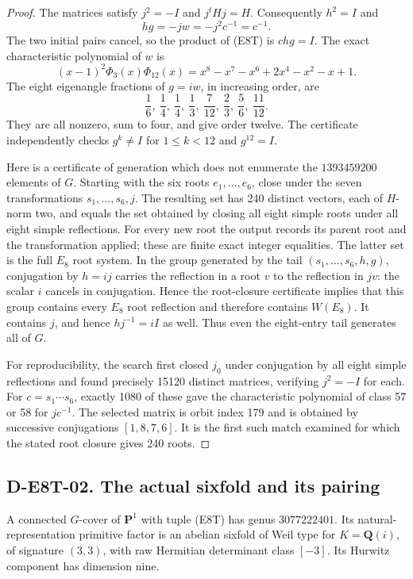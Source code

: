 \begin{proof}
The matrices satisfy $j^2=-I$ and $j^tHj=H$. Consequently
$h^2=I$ and
\[
hg=-jw=-j^2c^{-1}=c^{-1}.
\]
The two initial pairs cancel, so the product of (E8T) is $chg=I$.
The exact characteristic polynomial of $w$ is
\[
(x-1)^2\Phi_3(x)\Phi_{12}(x)
=x^8-x^7-x^6+2x^4-x^2-x+1.
\]
The eight eigenangle fractions of $g=iw$, in increasing order, are
\[
\frac16,\ \frac14,\ \frac14,\ \frac13,\ \frac7{12},\
\frac23,\ \frac56,\ \frac{11}{12}.
\tag{E8T-spectrum}
\]
They are all nonzero, sum to four, and give order twelve.
The certificate independently checks $g^k\ne I$ for $1\le k<12$
and $g^{12}=I$.

Here is a certificate of generation which does not enumerate the
$1393459200$ elements of $G$. Starting with the six roots
$e_1,\ldots,e_6$, close under the seven transformations
$s_1,\ldots,s_6,j$. The resulting set has 240 distinct vectors, each
of $H$-norm two, and equals the set obtained by closing all eight
simple roots under all eight simple reflections. For every new root
the output records its parent root and the transformation applied;
these are finite exact integer equalities. The latter set is the full
$E_8$ root system. In the group generated by the tail
$(s_1,\ldots,s_6,h,g)$, conjugation by $h=ij$ carries the reflection
in a root $v$ to the reflection in $jv$: the scalar $i$ cancels in
conjugation. Hence the root-closure certificate implies that this
group contains every $E_8$ root reflection and therefore contains
$W(E_8)$. It contains $j$, and hence $hj^{-1}=iI$ as well. Thus even
the eight-entry tail generates all of $G$.

For reproducibility, the search first closed $j_0$ under conjugation
by all eight simple reflections and found precisely 15120 distinct
matrices, verifying $j^2=-I$ for each. For $c=s_1\cdots s_6$, exactly
1080 of these gave the characteristic polynomial of class 57 or 58
for $jc^{-1}$. The selected matrix is orbit index 179 and is obtained
by successive conjugations $[1,8,7,6]$. It is the first such match
examined for which the stated root closure gives 240 roots.
\end{proof}

\subsection*{D-E8T-02. The actual sixfold and its pairing}
A connected $G$-cover of $\mathbf P^1$ with tuple (E8T) has genus
$3077222401$. Its natural-representation primitive factor is an
abelian sixfold of Weil type for $K=\mathbf Q(i)$, of signature
$(3,3)$, with raw Hermitian determinant class $[-3]$. Its Hurwitz
component has dimension nine.


